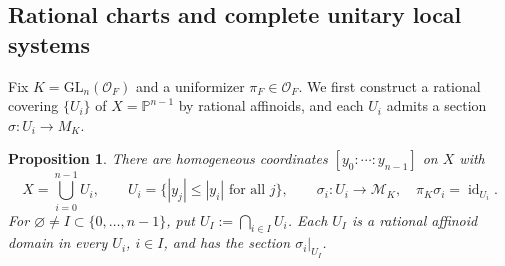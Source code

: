 \documentclass[11pt]{article}
\newtheorem{proposition}[theorem]{Proposition}
\theoremstyle{definition}
\newcommand{\cO}{\mathcal O}
\newcommand{\cM}{\mathcal M}
\begin{document}
\subsection{Rational charts and complete unitary local systems}
\label{subsec:local-unitarity}

Fix \(K=\mathrm{GL}_n(\cO_F)\) and a uniformizer
\(\pi_F\in\cO_F\). We first construct a rational covering $\{U_i\}$ of $X=\mathbb{P}^{n-1}$
by rational affinoids, and each $U_i$ admits a section $\sigma\colon U_i\to M_K$. 

\begin{proposition}%
\label{prop:GH-rational-cover}
There are homogeneous coordinates \([y_0:\cdots:y_{n-1}]\)
on \(X\) with
\begin{equation*}
 X=\bigcup_{i=0}^{n-1}U_i,\qquad
 U_i=\{ |y_j|\leq |y_i|\text{ for all }j\},\qquad
 \sigma_i:U_i\longrightarrow\cM_K,\quad
 \pi_K\sigma_i=\operatorname{id}_{U_i}.
\end{equation*}
For \(\varnothing\ne I\subset\{0,\ldots,n-1\}\), put
\(U_I:=\bigcap_{i\in I}U_i\).  Each \(U_I\) is a rational
affinoid domain in every \(U_i\), \(i\in I\), and has the
section \(\sigma_i|_{U_I}\).
\end{proposition}
\end{document}
